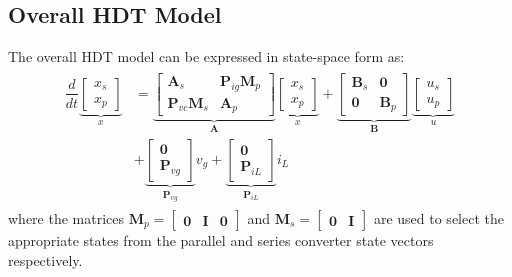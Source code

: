 \subsection{Overall HDT Model}
The overall HDT model can be expressed in state-space form as:
\begin{align}
    \begin{aligned}
        \dfrac{d}{dt}
        \underbrace{
        \begin{bmatrix}
            x_s\\
            x_p
        \end{bmatrix}
        }_{x}
        &=
        \underbrace{
        \begin{bmatrix}
            \mathbf{A}_s & \mathbf{P}_{ig}\mathbf{M}_p \\
            \mathbf{P}_{vc}\mathbf{M}_s & \mathbf{A}_p
        \end{bmatrix}
        }_{\mathbf{A}}
        \underbrace{
        \begin{bmatrix}
            x_s\\
            x_p
        \end{bmatrix}
        }_{x}
        +
        \underbrace{
        \begin{bmatrix}
            \mathbf{B}_s & \mathbf{0} \\
            \mathbf{0} & \mathbf{B}_p
        \end{bmatrix}
        }_{\mathbf{B}}
        \underbrace{
        \begin{bmatrix}
            u_s\\
            u_p 
        \end{bmatrix}
        }_{u}
        \\
        &+
        \underbrace{
        \begin{bmatrix}
            \mathbf{0}\\
            \mathbf{P}_{vg}
        \end{bmatrix}
        }_{\mathbf{P}_{vg}}
        v_g
        +
        \underbrace{
        \begin{bmatrix}
            \mathbf{0}\\
            \mathbf{P}_{iL}
        \end{bmatrix}
        }_{\mathbf{P}_{iL}}
        i_L
    \end{aligned}
\end{align}
where the matrices $\mathbf{M}_p = \begin{bmatrix}\mathbf{0} & \mathbf{I} & \mathbf{0}\end{bmatrix}$ and $\mathbf{M}_s = \begin{bmatrix}\mathbf{0} & \mathbf{I}\end{bmatrix}$ are used to select the appropriate states from the parallel and series converter state vectors respectively.

